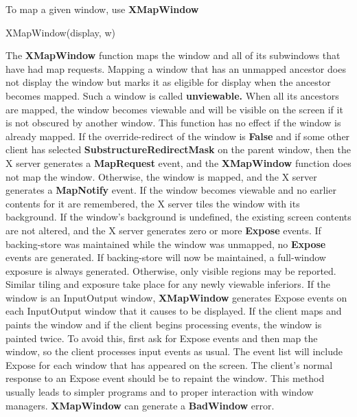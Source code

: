 \documentclass{report}
\begin{document}
\begin{itemize}
            \bigbreak \noindent 
            To map a given window, use \textbf{XMapWindow}
            \bigbreak \noindent 
            \begin{cppcode}
            XMapWindow(display, w)
            \end{cppcode}
            \bigbreak \noindent 
            The \textbf{XMapWindow} function maps the window and all of its subwindows that have had map requests. Mapping a window that has an unmapped ancestor does not display the window but marks it as eligible for display when the ancestor becomes mapped. Such a window is called \textbf{unviewable.} When all its ancestors are mapped, the window becomes viewable and will be visible on the screen if it is not obscured by another window. This function has no effect if the window is already mapped.
            \bigbreak \noindent 
            If the override-redirect of the window is \textbf{False} and if some other client has selected \textbf{SubstructureRedirectMask} on the parent window, then the X server generates a \textbf{MapRequest} event, and the \textbf{XMapWindow} function does not map the window. Otherwise, the window is mapped, and the X server generates a \textbf{MapNotify} event.
            \bigbreak \noindent 
            If the window becomes viewable and no earlier contents for it are remembered, the X server tiles the window with its background. If the window’s background is undefined, the existing screen contents are not altered, and the X server generates zero or more \textbf{Expose} events. If backing-store was maintained while the window was unmapped, no \textbf{Expose} events are generated. If backing-store will now be maintained, a full-window exposure is always generated. Otherwise, only visible regions may be reported. Similar tiling and exposure take place for any newly viewable inferiors.
            \bigbreak \noindent 
            If the window is an InputOutput window, \textbf{XMapWindow} generates Expose events on each InputOutput window that it causes to be displayed. If the client maps and paints the window and if the client begins processing events, the window is painted twice. To avoid this, first ask for Expose events and then map the window, so the client processes input events as usual. The event list will include Expose for each window that has appeared on the screen. The client’s normal response to an Expose event should be to repaint the window. This method usually leads to simpler programs and to proper interaction with window managers.
            \bigbreak \noindent 
            \textbf{XMapWindow} can generate a \textbf{BadWindow} error.

\end{itemize}
\end{document}
